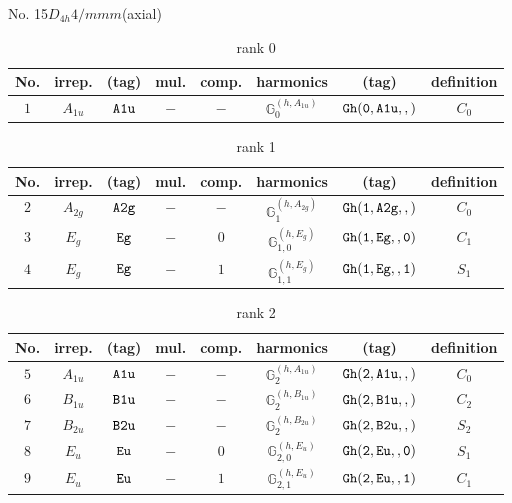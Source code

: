 \documentclass[fleqn,8pt]{jsarticle}
\begin{document}
\setcounter{MaxMatrixCols}{16}

\begin{center}
\LARGE
No. 15\quad$D_{4h}$\quad$4/mmm$\quad[ tetragonal ] (axial)
\end{center}
\begin{table}[ht!]
\begin{center}
\caption{rank 0}
\renewcommand{\arraystretch}{1.3}
\begin{tabular}{cccccccc} \hline \hline
No. & irrep. & (tag) & mul. & comp. & harmonics & (tag) & definition \\ \hline
$ 1 $ & $ A_{1u} $ & $ {\tt A1u} $ & $ - $ & $ - $ & $ \mathbb{G}_{0}^{(h,A_{1u})} $ & $ {\tt Gh(0,A1u,,)} $ & $ C_{0} $ \\
 \hline \hline
\end{tabular}
\end{center}
\end{table}
\begin{table}[ht!]
\begin{center}
\caption{rank 1}
\renewcommand{\arraystretch}{1.3}
\begin{tabular}{cccccccc} \hline \hline
No. & irrep. & (tag) & mul. & comp. & harmonics & (tag) & definition \\ \hline
$ 2 $ & $ A_{2g} $ & $ {\tt A2g} $ & $ - $ & $ - $ & $ \mathbb{G}_{1}^{(h,A_{2g})} $ & $ {\tt Gh(1,A2g,,)} $ & $ C_{0} $ \\
$ 3 $ & $ E_{g} $ & $ {\tt Eg} $ & $ - $ & $ 0 $ & $ \mathbb{G}_{1,0}^{(h,E_{g})} $ & $ {\tt Gh(1,Eg,,0)} $ & $ C_{1} $ \\
$ 4 $ & $ E_{g} $ & $ {\tt Eg} $ & $ - $ & $ 1 $ & $ \mathbb{G}_{1,1}^{(h,E_{g})} $ & $ {\tt Gh(1,Eg,,1)} $ & $ S_{1} $ \\
 \hline \hline
\end{tabular}
\end{center}
\end{table}
\begin{table}[ht!]
\begin{center}
\caption{rank 2}
\renewcommand{\arraystretch}{1.3}
\begin{tabular}{cccccccc} \hline \hline
No. & irrep. & (tag) & mul. & comp. & harmonics & (tag) & definition \\ \hline
$ 5 $ & $ A_{1u} $ & $ {\tt A1u} $ & $ - $ & $ - $ & $ \mathbb{G}_{2}^{(h,A_{1u})} $ & $ {\tt Gh(2,A1u,,)} $ & $ C_{0} $ \\
$ 6 $ & $ B_{1u} $ & $ {\tt B1u} $ & $ - $ & $ - $ & $ \mathbb{G}_{2}^{(h,B_{1u})} $ & $ {\tt Gh(2,B1u,,)} $ & $ C_{2} $ \\
$ 7 $ & $ B_{2u} $ & $ {\tt B2u} $ & $ - $ & $ - $ & $ \mathbb{G}_{2}^{(h,B_{2u})} $ & $ {\tt Gh(2,B2u,,)} $ & $ S_{2} $ \\
$ 8 $ & $ E_{u} $ & $ {\tt Eu} $ & $ - $ & $ 0 $ & $ \mathbb{G}_{2,0}^{(h,E_{u})} $ & $ {\tt Gh(2,Eu,,0)} $ & $ S_{1} $ \\
$ 9 $ & $ E_{u} $ & $ {\tt Eu} $ & $ - $ & $ 1 $ & $ \mathbb{G}_{2,1}^{(h,E_{u})} $ & $ {\tt Gh(2,Eu,,1)} $ & $ C_{1} $ \\
 \hline \hline
\end{tabular}
\end{center}
\end{table}
\end{document}
